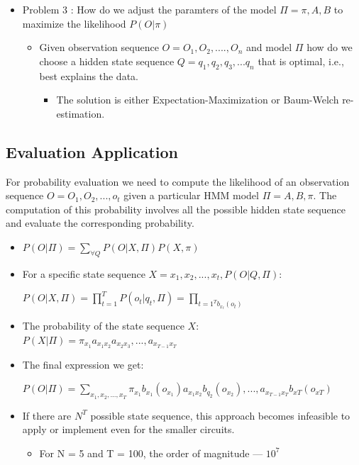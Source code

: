 \begin{itemize}
\item Problem 3 : How do we adjust the paramters of the model $\Pi = {\pi, A, B}$ to maximize the likelihood $P(O|\pi)$ 
 \begin{itemize}
 \item Given observation sequence $O = {O_1, O_2,....,}O_n$ and model $\Pi$ how do we choose a hidden state sequence $Q={q_1,q_2,q_3,...q_n}$
that is optimal, i.e., best explains the data. 
  \begin{itemize}
  \item The solution is either Expectation-Maximization or Baum-Welch re-estimation.
  \end{itemize}
 \end{itemize}
\end{itemize}









\subsection{Evaluation Application}

For probability evaluation we need to compute the likelihood of an observation sequence $O = {O_1, O_2,...,o_t}$ given a particular HMM model $ \Pi = {A, B, \pi}$. The computation of this probability involves all the possible hidden state sequence and evaluate the corresponding probability. 

\begin{itemize}

\item  $P(O | \Pi) = \sum\limits_{\forall Q}^{} P (O | X, \Pi) P (X, \pi)$ 

\item For a specific state sequence $X = {x_1, x_2,...,x_t}, P(O | Q, \Pi):$

 \hspace {0.2cm} $P (O | X, \Pi) = \prod_{t=1}^{T} P (o_t | q_t, \Pi) = \prod_{t=1^{T} b_{x_t} (o_t)}$
 
 \item The probability of the state sequence $X$:
 \\
 \hspace {0.2cm} $ P (X | \Pi ) = \pi_{x_1} a_{x_1 x_2} a_{x_2 x_3},...,a_{x_{T-1} x_T}$
 
 \item The final expression we get:
 


$P (O | \Pi ) = \sum\limits_{x_1, x_2,..., x_T} \pi_{x_1} b_{x_1} (o_{x_1}) a_{x_1 x_2} b_{q_2} (o_{x_2}),..., a_{x_{T-1} x_T} b_{xT} (o_{xT})$

\item If there are $N^T$ possible state sequence, this approach becomes infeasible to apply or implement even for the smaller circuits.

\begin{itemize}
\item For N = 5 and T = 100, the order of magnitude --- $10^7$
\end{itemize}
 

\end{itemize}


